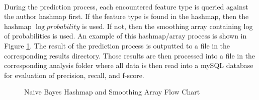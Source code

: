 	\paragraph{}During the prediction process, each encountered feature type is queried against the author hashmap first.  If the feature type is found in the hashmap, then the hashmap $\log{probability}$ is used.  If not, then the smoothing array containing log of probabilities is used.  An example of this hashmap/array process is shown in Figure \ref{fig:predictionFlowChart}. The result of the prediction process is outputted to a file in the corresponding results directory.  Those results are then processed into a file in the corresponding analysis folder where all data is then read into a mySQL database for evaluation of precision, recall, and f-score.
		\begin{figure}[h!]
			\begin{center}
				\caption{Naive Bayes Hashmap and Smoothing Array Flow Chart}
				\label{fig:predictionFlowChart}
			\end{center}
		\end{figure}

